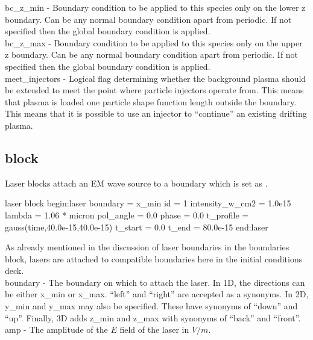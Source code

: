 {\emphtext bc\_z\_min} - Boundary condition to be applied to this species only
on the lower z boundary. Can be any normal boundary condition apart
from periodic. If not specified then the global boundary condition is applied.\\

{\emphtext bc\_z\_max} - Boundary condition to be applied to this species only
on the upper z boundary. Can be any normal boundary condition apart
from periodic. If not specified then the global boundary condition is applied.\\

{\emphtext meet\_injectors} - Logical flag determining whether the background
plasma
should be extended to meet the point where particle injectors operate from.
This means that plasma is loaded one particle shape function length outside the
boundary. This means that it is possible to use an injector to ``continue'' an
existing drifting plasma. 


\subsection{\texorpdfstring
  { block}
  {           {laser} block}}
\label{sec:laser_block}
Laser blocks attach an EM wave source to a boundary which is set as
.
\begin{lboxverbatim}{laser block}
begin:laser
   boundary = x_min
   id = 1
   intensity_w_cm2 = 1.0e15
   lambda = 1.06 * micron
   pol_angle = 0.0
   phase = 0.0
   t_profile = gauss(time,40.0e-15,40.0e-15)
   t_start = 0.0
   t_end = 80.0e-15
end:laser
\end{lboxverbatim}

As already mentioned in the discussion of laser boundaries in the boundaries
block, lasers are attached to compatible boundaries here in the initial
conditions deck.\\

{\emphtext boundary} - The boundary on which to attach the laser.
  In 1D, the directions can be either x\_min or x\_max.  ``left'' and ``right''
  are accepted as a synonyms. In 2D, y\_min and y\_max may also be specified.
  These have synonyms of ``down'' and ``up''. Finally, 3D adds z\_min and z\_max
  with synonyms of ``back'' and ``front''.\\

{\emphtext amp} - The amplitude of the $E$ field of the laser in $V/m$.\\

